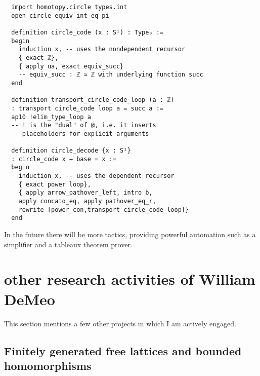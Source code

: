 \documentclass[11pt]{amsart}  %
\begin{document}
\begin{enumerate}
\begin{lstlisting}
  import homotopy.circle types.int
  open circle equiv int eq pi
  
  definition circle_code (x : S¹) : Type₀ :=
  begin
    induction x, -- uses the nondependent recursor
    { exact ℤ},
    { apply ua, exact equiv_succ}
    -- equiv_succ : ℤ ≃ ℤ with underlying function succ
  end
  
  definition transport_circle_code_loop (a : ℤ)
  : transport circle_code loop a = succ a :=
  ap10 !elim_type_loop a
  -- ! is the "dual" of @, i.e. it inserts
  -- placeholders for explicit arguments
  
  definition circle_decode {x : S¹}
  : circle_code x → base = x :=
  begin
    induction x, -- uses the dependent recursor
    { exact power loop},
    { apply arrow_pathover_left, intro b,
    apply concato_eq, apply pathover_eq_r,
    rewrite [power_con,transport_circle_code_loop]}
  end
\end{lstlisting}

In the future there will be more tactics, providing powerful automation such as a simplifier and a tableaux theorem prover.
\end{enumerate}
\fi













\ifextver

\section{other research activities of William DeMeo}
\label{sec:other}
This section mentions a few other projects in which I am actively engaged.

\subsection{Finitely generated free lattices and bounded homomorphisms}
\label{sec:fg-free-lat}
\end{document}
